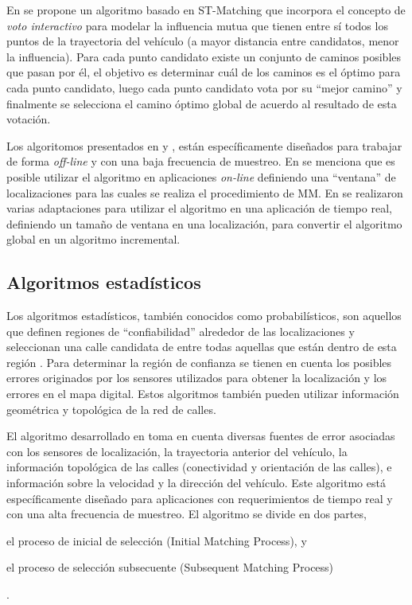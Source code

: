 En \cite{yuan2010interactive} se propone un algoritmo basado en ST-Matching que incorpora el concepto de \emph{voto interactivo} para modelar la influencia mutua que tienen entre sí todos los puntos de la trayectoria del vehículo (a mayor distancia entre candidatos, menor la influencia). Para cada punto candidato existe un conjunto de caminos posibles que pasan por él, el objetivo es determinar cuál de los caminos es el óptimo para cada punto candidato, luego cada punto candidato vota por su “mejor camino” y finalmente se selecciona el camino óptimo global de acuerdo al resultado de esta votación.

Los algoritomos presentados en \cite{lou2009map} y \cite{yuan2010interactive}, están específicamente diseñados para trabajar de forma \emph{off-line} y con una baja frecuencia de muestreo. En \cite{lou2009map} se  menciona que es posible utilizar el algoritmo en aplicaciones \emph{on-line} definiendo una “ventana” de localizaciones para las cuales se realiza el procedimiento de MM. En \cite{sakic2012map} se realizaron varias adaptaciones para utilizar el algoritmo en una aplicación de tiempo real, definiendo un tamaño de ventana en una localización, para convertir el algoritmo global en un algoritmo incremental.

\subsection{Algoritmos estadísticos}

Los algoritmos estadísticos, también conocidos como probabilísticos, son aquellos que definen regiones de “confiabilidad” alrededor de las localizaciones y seleccionan una calle candidata de entre todas aquellas que están dentro de esta región \cite{quddus2007current}. Para determinar la región de confianza se tienen en cuenta los posibles errores originados por los sensores utilizados para obtener la localización y los errores en el mapa digital. Estos algoritmos también pueden utilizar información geométrica y topológica de la red de calles.

El algoritmo desarrollado en \cite{ochieng2009map} toma en cuenta diversas fuentes de error asociadas con los sensores de localización, la trayectoria anterior del vehículo, la información topológica de las calles (conectividad y orientación de las calles), e información sobre la velocidad y la dirección del vehículo. Este algoritmo está específicamente diseñado para aplicaciones con requerimientos de tiempo real y con una alta frecuencia de muestreo. El algoritmo se divide en dos partes, \begin{enumerate*}[a)]
\item el proceso de inicial de selección (Initial Matching Process), y \item el proceso de selección subsecuente (Subsequent Matching Process)\end{enumerate*}. 

